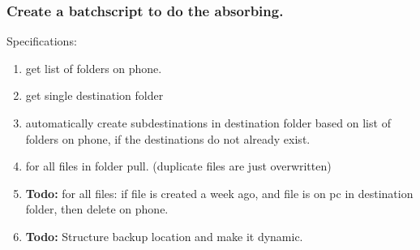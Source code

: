 \subsubsection{Create a batchscript to do the absorbing.}
Specifications:
\begin{enumerate}
    \item get list of folders on phone.
    \item get single destination folder
    \item automatically create subdestinations in destination folder based on list of folders on phone, if the destinations do not already exist.
    \item for all files in folder pull. (duplicate files are just overwritten)
    \item \textbf{Todo:} for all files: if file is created a week ago, and file is on pc in destination folder, then delete on phone.
    \item \textbf{Todo:} Structure backup location and make it dynamic.
\end{enumerate}

